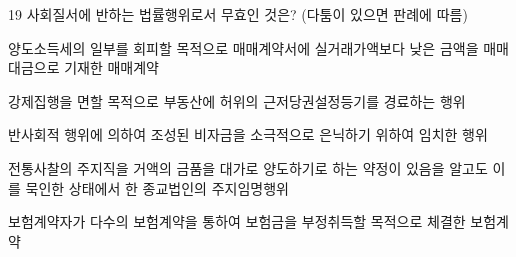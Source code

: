 \begin{question}{19}
사회질서에 반하는 법률행위로서 무효인 것은? (다툼이 있으면 판례에 따름)
\begin{choices}
  \item 양도소득세의 일부를 회피할 목적으로 매매계약서에 실거래가액보다 낮은 금액을 매매대금으로 기재한 매매계약
  \item 강제집행을 면할 목적으로 부동산에 허위의 근저당권설정등기를 경료하는 행위
  \item 반사회적 행위에 의하여 조성된 비자금을 소극적으로 은닉하기 위하여 임치한 행위
  \item 전통사찰의 주지직을 거액의 금품을 대가로 양도하기로 하는 약정이 있음을 알고도 이를 묵인한 상태에서 한 종교법인의 주지임명행위
  \item 보험계약자가 다수의 보험계약을 통하여 보험금을 부정취득할 목적으로 체결한 보험계약
\end{choices}
\end{question}
